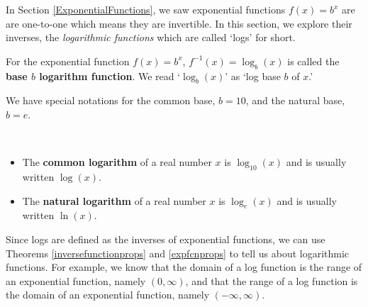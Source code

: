 \documentclass{ximera}
\begin{document}
	\author{Stitz-Zeager}




\setcounter{footnote}{0}

\label{LogarithmicFunctions}


In Section \ref{ExponentialFunctions}, we saw exponential functions $f(x) = b^x$  are are one-to-one which means they are invertible.   In this section, we explore their inverses, the \textit{logarithmic functions} which are called `logs' for short.

 


\begin{definition} \label{logfcndefn} For the exponential function $f(x) = b^{x}$,  $f^{-1}(x) = \log_{b}(x)$ is called the  \textbf{base \boldmath $b$ logarithm function}.  We read `$\log_{b}(x)$' as `log base $b$ of $x$.' 

\end{definition}

 

We have special notations for the common base, $b=10$, and the natural base, $b=e$.



\begin{definition} $~$

\begin{itemize}

\item  The  \textbf{common logarithm} of a real number $x$ is $\log_{10}(x)$ and is usually written $\log(x)$.   

\item The  \textbf{natural logarithm} of a real number $x$ is $\log_{e}(x)$ and is usually written $\ln(x)$.  

\end{itemize}

\end{definition}

 

Since logs are defined as the inverses of exponential functions, we can use Theorems \ref{inversefunctionprops} and \ref{expfcnprops} to tell us about logarithmic functions.  For example, we know that the domain of a log function is the range of an exponential function, namely $(0, \infty)$, and that the range of a log function is the domain of an exponential function, namely $(-\infty, \infty)$.   
\end{document}
